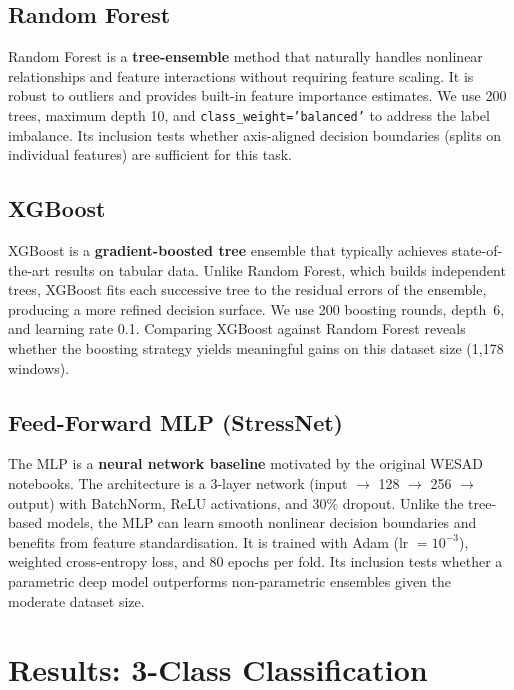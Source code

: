 \documentclass[11pt]{article}
\begin{document}
\subsection{Random Forest}
Random Forest is a \textbf{tree-ensemble} method that naturally handles nonlinear relationships and feature interactions without requiring feature scaling.
It is robust to outliers and provides built-in feature importance estimates.
We use 200 trees, maximum depth 10, and \texttt{class\_weight='balanced'} to address the label imbalance.
Its inclusion tests whether axis-aligned decision boundaries (splits on individual features) are sufficient for this task.

\subsection{XGBoost}
XGBoost is a \textbf{gradient-boosted tree} ensemble that typically achieves state-of-the-art results on tabular data.
Unlike Random Forest, which builds independent trees, XGBoost fits each successive tree to the residual errors of the ensemble, producing a more refined decision surface.
We use 200 boosting rounds, depth~6, and learning rate 0.1.
Comparing XGBoost against Random Forest reveals whether the boosting strategy yields meaningful gains on this dataset size (1{,}178 windows).

\subsection{Feed-Forward MLP (StressNet)}
The MLP is a \textbf{neural network baseline} motivated by the original WESAD notebooks.
The architecture is a 3-layer network (input $\rightarrow$ 128 $\rightarrow$ 256 $\rightarrow$ output) with BatchNorm, ReLU activations, and 30\% dropout.
Unlike the tree-based models, the MLP can learn smooth nonlinear decision boundaries and benefits from feature standardisation.
It is trained with Adam (lr $= 10^{-3}$), weighted cross-entropy loss, and 80 epochs per fold.
Its inclusion tests whether a parametric deep model outperforms non-parametric ensembles given the moderate dataset size.

\section{Results: 3-Class Classification}
\label{sec:results-3class}
\end{document}
